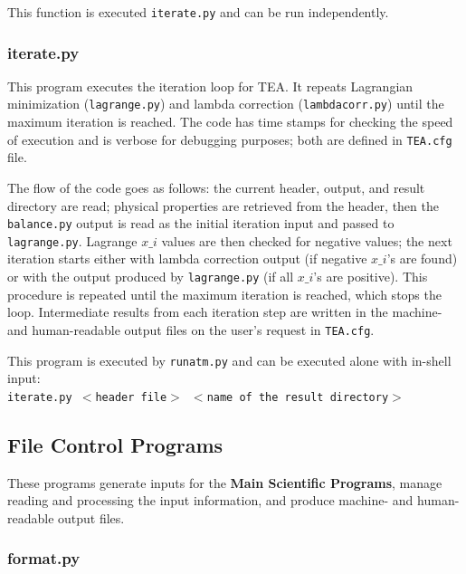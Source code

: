This function is executed \texttt{iterate.py} and can be run
independently.

\subsubsection{iterate.py}

This program executes the iteration loop for TEA. It repeats
Lagrangian minimization \newline (\texttt{lagrange.py}) and lambda
correction (\texttt{lambdacorr.py}) until the maximum iteration is
reached. The code has time stamps for checking the speed of execution
and is verbose for debugging purposes; both are defined
in \texttt{TEA.cfg} file.

The flow of the code goes as follows: the current header, output, and
result directory are read; physical properties are retrieved from the
header, then the \texttt{balance.py} output is read as the initial
iteration input and passed to \texttt{lagrange.py}. Lagrange $x\_i$
values are then checked for negative values; the next iteration starts
either with lambda correction output (if negative $x\_i$'s are found)
or with the output produced by \texttt{lagrange.py} (if all $x\_i$'s
are positive). This procedure is repeated until the maximum iteration
is reached, which stops the loop. Intermediate results from each
iteration step are written in the machine- and human-readable output
files on the user's request in \texttt{TEA.cfg}.

This program is executed by \texttt{runatm.py} and can be executed
alone with in-shell input: \\
\texttt{iterate.py $<$header file$>$ $<$name of the result directory$>$}



\subsection{File Control Programs} 

These programs generate inputs for the {\bf Main Scientific
Programs}, manage reading and processing the input information, and
produce machine- and human-readable output files.

\subsubsection{format.py}

